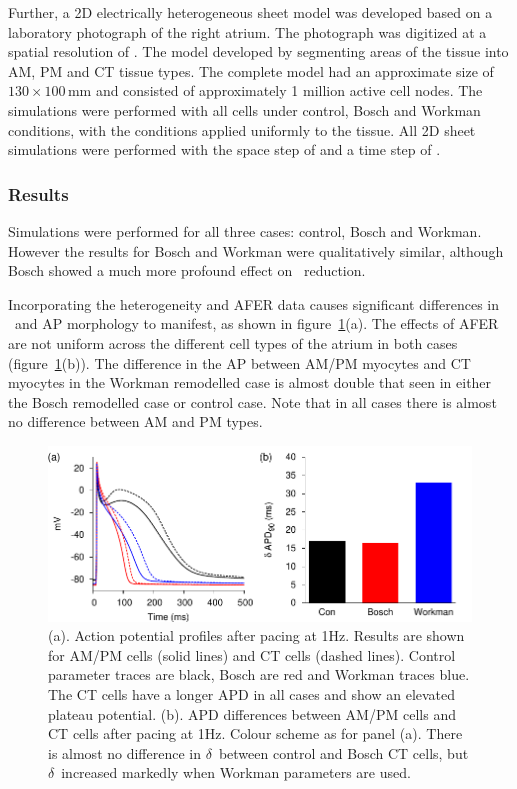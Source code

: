 Further, a 2D electrically heterogeneous sheet model was developed based on a
laboratory photograph of the right atrium.  The photograph was digitized at a
spatial resolution of . The model developed by segmenting areas of the
tissue into AM, PM and CT tissue types.  The complete model had an approximate size of
$130\times100\,\text{mm}$ and consisted of approximately 1 million active cell nodes.  The
simulations were performed with all cells under control, Bosch and Workman conditions,
with the conditions applied uniformly to the tissue.  All 2D sheet simulations
were performed with the space step of  and a time step of .

\subsubsection{Results}

Simulations were performed for all three cases: control, Bosch and Workman.
However the results for Bosch and Workman were qualitatively similar, although
Bosch showed a much more profound effect on \apd\ reduction.

Incorporating the heterogeneity and AFER data causes significant differences in
\apd\ and AP morphology to manifest, as shown in
figure~\ref{fig:toolkit:afer:apd}(a).
The effects of AFER are not uniform across the different cell types of the
atrium in both cases (figure~\ref{fig:toolkit:afer:apd}(b)).
The difference in the AP between AM/PM myocytes and CT myocytes in the Workman
remodelled case is almost double that seen in either the Bosch remodelled case
or control case.
Note that in all cases there is almost no difference between AM and PM types.

\begin{figure}
\centering
\includegraphics{figures/toolkit/afer/figures/01_APD}
\caption[AFER AP Plots And APD differences]{
\label{fig:toolkit:afer:apd}
(a).
Action potential profiles after pacing at \unit{1}{Hz}.
Results are shown for AM/PM cells (solid lines) and CT cells (dashed lines).
Control parameter traces are black, Bosch are red and Workman traces
blue.
The CT cells have a longer APD in all cases and show an elevated plateau
potential.
(b).
APD differences between AM/PM cells and CT cells after pacing at \unit{1}{Hz}.
Colour scheme as for panel (a).
There is almost no difference in $\delta$\apd\ between control and Bosch CT cells,
but $\delta$\apd\ increased markedly when Workman parameters are used.
}
\end{figure}

